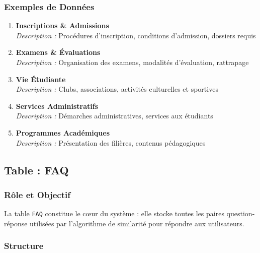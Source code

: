 \documentclass[11pt,a4paper]{article}
\begin{document}
\subsubsection{Exemples de Données}

\begin{exemple}
\begin{enumerate}
    \item \textbf{Inscriptions \& Admissions} \\
    \textit{Description :} Procédures d'inscription, conditions d'admission, dossiers requis
    
    \item \textbf{Examens \& Évaluations} \\
    \textit{Description :} Organisation des examens, modalités d'évaluation, rattrapage
    
    \item \textbf{Vie Étudiante} \\
    \textit{Description :} Clubs, associations, activités culturelles et sportives
    
    \item \textbf{Services Administratifs} \\
    \textit{Description :} Démarches administratives, services aux étudiants
    
    \item \textbf{Programmes Académiques} \\
    \textit{Description :} Présentation des filières, contenus pédagogiques
\end{enumerate}
\end{exemple}

\clearpage

\subsection{Table : FAQ}

\subsubsection{Rôle et Objectif}

La table \texttt{FAQ} constitue le cœur du système : elle stocke toutes les paires question-réponse utilisées par l'algorithme de similarité pour répondre aux utilisateurs.

\subsubsection{Structure}
\end{document}
